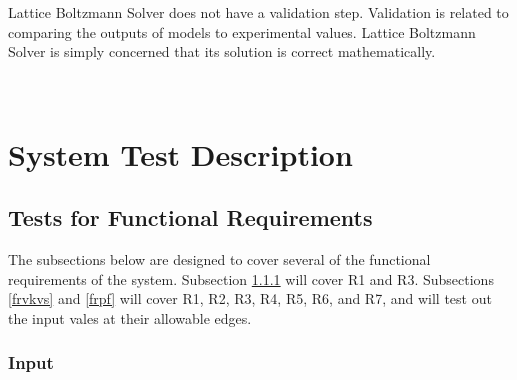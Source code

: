 \documentclass[12pt, titlepage]{article}
\newcommand{\famname}{Lattice Boltzmann Solver}
\begin{document}
{\famname} does not have a validation step. Validation is related to comparing the outputs of models to experimental values. {\famname} is simply concerned that its solution is correct mathematically.


~\newpage	 

\section{System Test Description} \label{systest}

\subsection{Tests for Functional Requirements}

\label{testfr}

The subsections below are designed to cover several of the functional
requirements of the system. Subsection \ref{frinput} will cover R1 and
R3. Subsections \ref{frvkvs} and \ref{frpf} will cover R1, R2, R3, R4, R5, R6,
and R7, and will test out the input vales at their allowable edges.

\subsubsection{Input}
\label{frinput}
		
\end{document}

